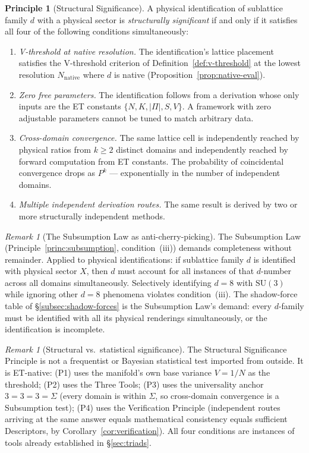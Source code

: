 \documentclass[11pt,a4paper]{article}
\theoremstyle{definition}
\newtheorem{principle}[theorem]{Principle}
\theoremstyle{remark}
\newtheorem{remark}[theorem]{Remark}
\begin{document}
\begin{principle}[Structural Significance]\label{princ:structural-significance}
A physical identification of sublattice family $d$ with a physical sector is \emph{structurally significant} if and only if it satisfies all four of the following conditions simultaneously:
\begin{enumerate}[label=\textnormal{(P\arabic*)},leftmargin=*]
\item \emph{V-threshold at native resolution.} The identification's lattice placement satisfies the V-threshold criterion of Definition~\ref{def:v-threshold} at the lowest resolution $N_{\mathrm{native}}$ where $d$ is native (Proposition~\ref{prop:native-eval}).
\item \emph{Zero free parameters.} The identification follows from a derivation whose only inputs are the ET constants $\{N, K, |\Pi|, S, V\}$. A framework with zero adjustable parameters cannot be tuned to match arbitrary data.
\item \emph{Cross-domain convergence.} The same lattice cell is independently reached by physical ratios from $k \ge 2$ distinct domains and independently reached by forward computation from ET constants. The probability of coincidental convergence drops as $P^{k}$ --- exponentially in the number of independent domains.
\item \emph{Multiple independent derivation routes.} The same result is derived by two or more structurally independent methods.
\end{enumerate}
\end{principle}

\begin{remark}[The Subsumption Law as anti-cherry-picking]
The Subsumption Law (Principle~\ref{princ:subsumption}, condition~(iii)) demands completeness without remainder. Applied to physical identifications: if sublattice family $d$ is identified with physical sector $X$, then $d$ must account for all instances of that $d$-number across all domains simultaneously. Selectively identifying $d=8$ with $\mathrm{SU}(3)$ while ignoring other $d=8$ phenomena violates condition~(iii). The shadow-force table of \S\ref{subsec:shadow-forces} is the Subsumption Law's demand: every $d$-family must be identified with all its physical renderings simultaneously, or the identification is incomplete.
\end{remark}

\begin{remark}[Structural vs.\ statistical significance]
The Structural Significance Principle is not a frequentist or Bayesian statistical test imported from outside. It is ET-native: (P1) uses the manifold's own base variance $V = 1/N$ as the threshold; (P2) uses the Three Tools; (P3) uses the universality anchor $3=3=3=\Sigma$ (every domain is within $\Sigma$, so cross-domain convergence is a Subsumption test); (P4) uses the Verification Principle (independent routes arriving at the same answer equals mathematical consistency equals sufficient Descriptors, by Corollary~\ref{cor:verification}). All four conditions are instances of tools already established in \S\ref{sec:triads}.
\end{remark}
\end{document}
